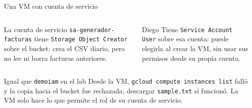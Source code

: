 \documentclass[aspectratio=169,10pt,c]{beamer}
\begin{document}
\begin{frame}{Una VM con cuenta de servicio}
\begin{center}
\end{center}
\begin{columns}[T,onlytextwidth]
\begin{block}{La cuenta de servicio}
\small \texttt{sa-generador-facturas} tiene \texttt{Storage Object Creator} sobre el bucket: crea el CSV diario, pero no lee ni borra facturas anteriores.
\end{block}
\begin{block}{Diego}
\small Tiene \texttt{Service Account User} sobre esa cuenta: puede elegirla al crear la VM, sin usar sus permisos desde su propia cuenta.
\end{block}
\end{columns}
\par\vspace{2mm}
\begin{exampleblock}{Igual que \texttt{demoiam} en el lab}
\small Desde la VM, \texttt{gcloud compute instances list} falló y la copia hacia el bucket fue rechazada; descargar \texttt{sample.txt} sí funcionó. La VM solo hace lo que permite el rol de su cuenta de servicio.
\end{exampleblock}
\end{frame}
\end{document}
